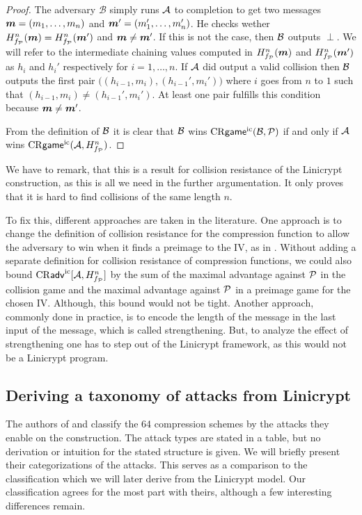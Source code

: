 \begin{proof}
    The adversary $\mathcal{B}$ simply runs $\A$ to completion to get two messages
    $\vm = (\dts m n)$ and $\vm' = (\dts {m'} n)$.
    He checks wether $\PMD{f_\P}(\vm) = \PMD{f_\P}(\vm')$ and $\vm \neq \vm'$.
    If this is not the case, then $\advB$ outputs $\perp$.
    We will refer to the intermediate chaining values computed in $\PMD{f_\P}(\vm)$ and $\PMD{f_\P}(\vm')$ as $h_i$ and $h_i'$ respectively for $i=1, \dots, n$.
    If $\A$ did output a valid collision then $\advB$ outputs the first pair $\big((h_{i-1}, m_i), (h_{i-1}', m_i')\big)$ where $i$ goes from $n$ to $1$ such that $(h_{i-1}, m_i) \neq (h_{i-1}', m_i')$.
    At least one pair fulfills this condition because $\vm \neq \vm'$.
    
    From the definition of $\advB$ it is clear that $\advB$ wins $\crgame(\advB, \P)$ if and only if $\A$ wins $\crgame(\A, \PMD{f_\P})$.
\end{proof}

We have to remark, that this is a result for collision resistance of the Linicrypt \MD construction,
as this is all we need in the further argumentation.
It only proves that it is hard to find collisions of the same length $n$.

To fix this, different approaches are taken in the literature.
One approach is to change the definition of collision resistance for the compression function to allow the adversary to win when it finds a preimage to the IV,
as in \cite{C:BlaRogShr02}.
Without adding a separate definition for collision resistance of compression functions,
we could also bound $\cradv{\A, \PMD{f_\P}}$ by the sum of the maximal advantage against $\P$ in the collision game and the maximal advantage against $\P$ in a preimage game for the chosen IV.
Although, this bound would not be tight.
Another approach, commonly done in practice, is to encode the length of the message in the last input of the message,
which is called \MD strengthening.
But, to analyze the effect of \MD strengthening one has to step out of the Linicrypt framework,
as this would not be a Linicrypt program.

\subsection{Deriving a taxonomy of attacks from Linicrypt}

The authors of \cite{C:PreGovVan93} and \cite{C:BlaRogShr02} classify the 64 compression schemes by the attacks they enable on the \MD construction.
The attack types are stated in a table, but no derivation or intuition for the stated structure is given.
We will briefly present their categorizations of the attacks.
This serves as a comparison to the classification which we will later derive from the Linicrypt model.
Our classification agrees for the most part with theirs,
although a few interesting differences remain.

